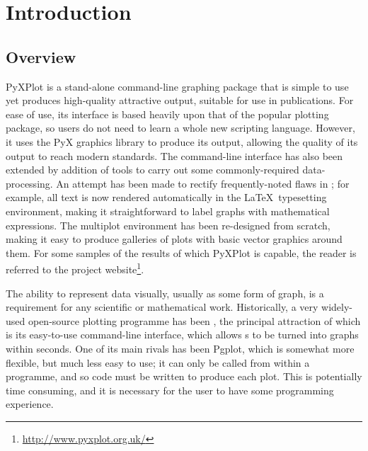 %
%
%
%
%



\chapter{Introduction} 

\label{introduction}

\section{Overview}

{\sc PyXPlot} is a stand-alone command-line graphing package that is simple to
use yet produces high-quality attractive output, suitable for use in
publications. For ease of use, its interface is based heavily upon that of the
popular {\sc \gnuplot} plotting package, so users do not need to
learn a whole new scripting language. However, it uses the PyX graphics library
to produce its output, allowing the quality of its output to reach modern
standards.  The command-line interface has also been extended by addition of
tools to carry out some commonly-required data-processing.  An attempt has been
made to rectify frequently-noted flaws in \gnuplot; for example, all text is
now rendered automatically in the \LaTeX\ typesetting environment, making it
straightforward to label graphs with mathematical expressions. The multiplot
environment has been re-designed from scratch, making it easy to produce
galleries of plots with basic vector graphics around them.  For some samples of
the results of which PyXPlot is capable, the reader is referred to the project
website\footnote{\url{http://www.pyxplot.org.uk/}}.

The ability to represent data visually, usually as some form of graph, is a
requirement for any scientific or mathematical work.  Historically, a very
widely-used open-source plotting programme has been \gnuplot, the principal
attraction of which is its easy-to-use command-line interface, which allows
\datafile s to be turned into graphs within seconds. One of its main rivals has
been {\sc Pgplot}, which is somewhat more flexible, but much less
easy to use; it can only be called from within a programme, and so code must be
written to produce each plot.  This is potentially time consuming, and it is
necessary for the user to have some programming experience.

